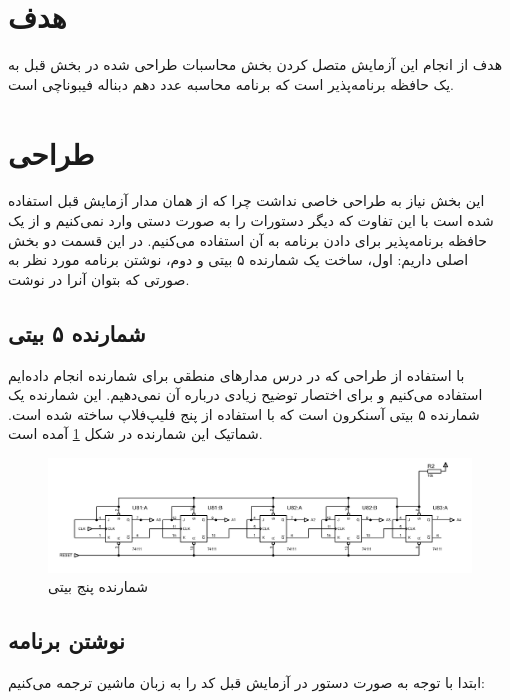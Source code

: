 \documentclass{article}
\begin{document}
\section{هدف}
هدف از انجام این آزمایش متصل کردن بخش محاسبات طراحی شده در بخش قبل به یک حافظه برنامه‌پذیر است که برنامه محاسبه عدد دهم دبناله فیبوناچی است.

\section{طراحی}
این بخش نیاز به طراحی خاصی نداشت چرا که از همان مدار آزمایش قبل استفاده شده است با این تفاوت که دیگر دستورات را به صورت دستی وارد نمی‌کنیم و از یک حافظه‌ برنامه‌پذیر برای دادن برنامه به آن استفاده می‌کنیم. در این قسمت دو بخش اصلی داریم: اول، ساخت یک شمارنده ۵ بیتی و دوم، نوشتن برنامه مورد نظر به صورتی که بتوان آنرا در  نوشت.

\subsection{شمارنده ۵ بیتی}
با استفاده از طراحی که در درس مدارهای‌ منطقی برای شمارنده انجام داده‌ایم استفاده می‌کنیم و برای اختصار توضیح زیادی درباره آن نمی‌دهیم. این شمارنده یک شمارنده ۵ بیتی آسنکرون است که با استفاده از پنج فلیپ‌فلاپ  ساخته شده است. شماتیک این شمارنده در شکل \ref{counter} آمده است.

\begin{figure}[H]
	\centering
	\includegraphics[scale=0.5]{./graphics/counter}
	\caption{شمارنده پنج بیتی}
	\label{counter}
\end{figure}

\subsection{نوشتن برنامه}
ابتدا با توجه به صورت دستور در آزمایش قبل کد را به زبان ماشین ترجمه می‌کنیم:
\end{document}
